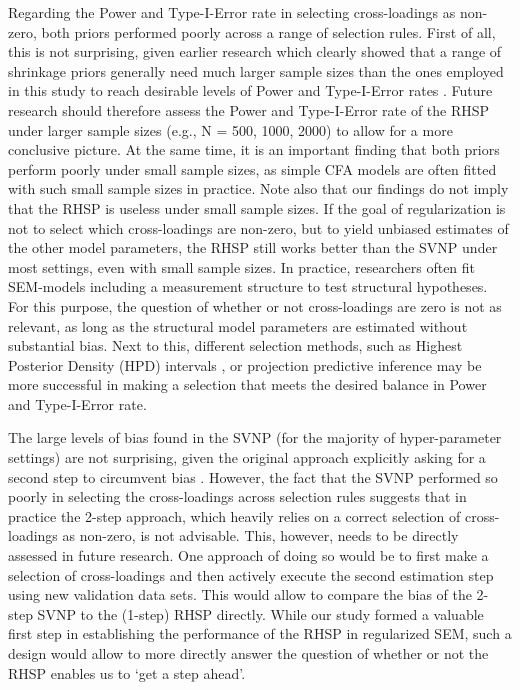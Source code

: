 \documentclass[]{interact}
\theoremstyle{plain}%
\theoremstyle{definition}
\theoremstyle{remark}
\begin{document}
Regarding the Power and Type-I-Error rate in selecting cross-loadings as
non-zero, both priors performed poorly across a range of selection
rules. First of all, this is not surprising, given earlier research
which clearly showed that a range of shrinkage priors \citep[SVNP,
Bayesian LASSO, Spike-and-Slab
Prior,][]{lu_bayesian_2016, zhang_criteria_2021} generally need much
larger sample sizes than the ones employed in this study to reach
desirable levels of Power and Type-I-Error rates \citep[see][who show
that frequentist variable selection methods are sensitive to sample size
too]{jacobucci_regularized_2016, lu_bayesian_2016}. Future research
should therefore assess the Power and Type-I-Error rate of the RHSP
under larger sample sizes (e.g., N = 500, 1000, 2000) to allow for a
more conclusive picture. At the same time, it is an important finding
that both priors perform poorly under small sample sizes, as simple CFA
models are often fitted with such small sample sizes in practice. Note
also that our findings do not imply that the RHSP is useless under small
sample sizes. If the goal of regularization is not to select which
cross-loadings are non-zero, but to yield unbiased estimates of the
other model parameters, the RHSP still works better than the SVNP under
most settings, even with small sample sizes. In practice, researchers
often fit SEM-models including a measurement structure to test
structural hypotheses. For this purpose, the question of whether or not
cross-loadings are zero is not as relevant, as long as the structural
model parameters are estimated without substantial bias. Next to this,
different selection methods, such as Highest Posterior Density (HPD)
intervals \citep{zhang_criteria_2021}, or projection predictive
inference \citep{piironen_sparsity_2017} may be more successful in
making a selection that meets the desired balance in Power and
Type-I-Error rate.

The large levels of bias found in the SVNP (for the majority of
hyper-parameter settings) are not surprising, given the original
approach explicitly asking for a second step to circumvent bias
\citep{muthen_bayesian_2012}. However, the fact that the SVNP performed
so poorly in selecting the cross-loadings across selection rules
suggests that in practice the 2-step approach, which heavily relies on a
correct selection of cross-loadings as non-zero, is not advisable. This,
however, needs to be directly assessed in future research. One approach
of doing so would be to first make a selection of cross-loadings and
then actively execute the second estimation step using new validation
data sets. This would allow to compare the bias of the 2-step SVNP to
the (1-step) RHSP directly. While our study formed a valuable first step
in establishing the performance of the RHSP in regularized SEM, such a
design would allow to more directly answer the question of whether or
not the RHSP enables us to `get a step ahead'.
\end{document}
